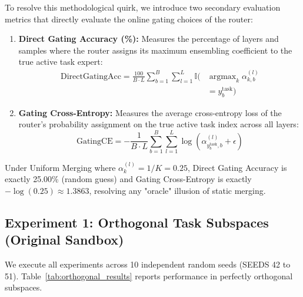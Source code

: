 To resolve this methodological quirk, we introduce two secondary evaluation metrics that directly evaluate the online gating choices of the router:
\begin{enumerate}
  \item \textbf{Direct Gating Accuracy (\%):} Measures the percentage of layers and samples where the router assigns its maximum ensembling coefficient to the true active task expert:
  \begin{equation}
  \begin{split}
  \text{DirectGatingAcc} = \frac{100}{B \cdot L} \sum_{b=1}^B \sum_{l=1}^L \mathbb{I}\Big( &\operatorname{argmax}_k \alpha_{k, b}^{(l)} \\
  &= y_b^{\text{task}} \Big)
  \end{split}
  \end{equation}
  \item \textbf{Gating Cross-Entropy:} Measures the average cross-entropy loss of the router's probability assignment on the true active task index across all layers:
  \begin{equation}
  \text{GatingCE} = -\frac{1}{B \cdot L} \sum_{b=1}^B \sum_{l=1}^L \log \left( \alpha_{y_b^{\text{task}}, b}^{(l)} + \epsilon \right)
  \end{equation}
\end{enumerate}
Under Uniform Merging where $\alpha_k^{(l)} = 1/K = 0.25$, Direct Gating Accuracy is exactly 25.00\% (random guess) and Gating Cross-Entropy is exactly $-\log(0.25) \approx 1.3863$, resolving any "oracle" illusion of static merging.

\subsection{Experiment 1: Orthogonal Task Subspaces (Original Sandbox)}
We execute all experiments across 10 independent random seeds (SEEDS 42 to 51). Table~\ref{tab:orthogonal_results} reports performance in perfectly orthogonal subspaces.

